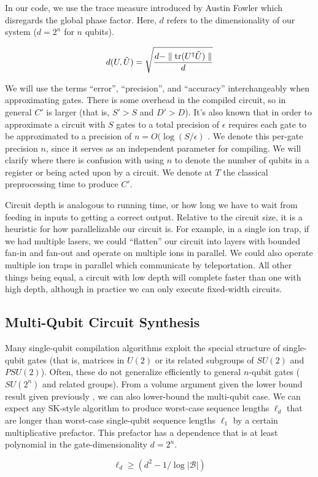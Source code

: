 In our code, we use the trace measure introduced by Austin Fowler which disregards
the global phase factor. Here,
$d$ refers to the dimensionality
of our system ($d = 2^n$ for $n$ qubits).

\begin{equation}
d(U,\tilde{U}) = \sqrt{\frac{d - \parallel \mathrm{tr}(U^\dagger \tilde{U}) \parallel}{d}}
\end{equation}

We will use the terms ``error'', ``precision'', and
``accuracy'' interchangeably when approximating gates.
There is some overhead in the compiled circuit, so in
general $C'$ is larger (that is, $S' > S$ and $D' > D$). It's also known that
in order to approximate a circuit with $S$ gates to a total precision of
$\epsilon$
requires each gate to be approximated to a precision of
$n = O(\log(S/\epsilon)$ \cite{Lloyd1995}. We denote this per-gate precision
$n$, since it serves as an independent parameter for compiling. We will clarify
where there is confusion with using $n$ to denote the number of qubits in a
register or being acted upon by a circuit.
We denote at $T$ the classical preprocessing time to
produce $C'$.
 
Circuit depth is analogous to running time, or how long we have to wait from
feeding in inputs to getting a correct output. Relative to the circuit size,
it is a heuristic for how parallelizable our
circuit is. For example, in a single ion trap, if we had multiple lasers,
we could ``flatten'' our circuit into layers with bounded fan-in and
fan-out and operate on multiple ions in parallel.
We could also operate multiple ion traps in parallel which communicate by
teleportation.
All other things being equal, a circuit with low depth will complete
faster than one with high depth, although in practice we can only execute
fixed-width circuits.

\subsection{Multi-Qubit Circuit Synthesis}
\label{subsec:qcompile-multi}

Many single-qubit compilation algorithms exploit the special structure
of single-qubit gates (that is, matrices in $U(2)$ or its related subgroups
of $SU(2)$ and $PSU(2)$). Often, these do not generalize efficiently to general
$n$-qubit gates ($SU(2^n)$ and related groups). From a volume argument
given the lower bound
result given previously \cite{Harrow2003}, we can also lower-bound the
multi-qubit case. We can expect any
SK-style algorithm to produce worst-case sequence lengths $\ell_d$ that
are longer than worst-case single-qubit sequence lengths $\ell_1$ by a certain multiplicative
prefactor. This prefactor has a dependence that is at least
polynomial in the gate-dimensionality
$d = 2^n$. 

\begin{equation}
\ell_d \ge \left( d^2 -1 / \log |\mathcal{B}| \right )
\end{equation}